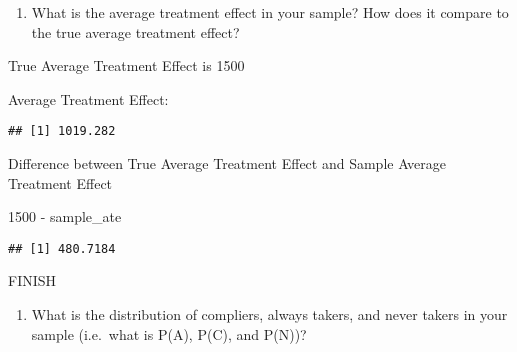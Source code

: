 \documentclass[
]{article}
\newenvironment{Shaded}{\begin{snugshade}}{\end{snugshade}}
\newcommand{\DecValTok}[1]{\textcolor[rgb]{0.00,0.00,0.81}{#1}}
\newcommand{\FunctionTok}[1]{\textcolor[rgb]{0.00,0.00,0.00}{#1}}
\newcommand{\NormalTok}[1]{#1}
\newcommand{\OtherTok}[1]{\textcolor[rgb]{0.56,0.35,0.01}{#1}}
\newcommand{\SpecialCharTok}[1]{\textcolor[rgb]{0.00,0.00,0.00}{#1}}
\newcommand{\StringTok}[1]{\textcolor[rgb]{0.31,0.60,0.02}{#1}}
\providecommand{\tightlist}{%
  \setlength{\itemsep}{0pt}\setlength{\parskip}{0pt}}
\begin{document}
\begin{enumerate}
\def\labelenumi{\arabic{enumi}.}
\tightlist
\item
  What is the average treatment effect in your sample? How does it
  compare to the true average treatment effect?
\end{enumerate}

True Average Treatment Effect is 1500

Average Treatment Effect:

\begin{Shaded}
\end{Shaded}

\begin{verbatim}
## [1] 1019.282
\end{verbatim}

Difference between True Average Treatment Effect and Sample Average
Treatment Effect

\begin{Shaded}
\begin{Highlighting}[]
\DecValTok{1500} \SpecialCharTok{{-}}\NormalTok{ sample\_ate}
\end{Highlighting}
\end{Shaded}

\begin{verbatim}
## [1] 480.7184
\end{verbatim}

FINISH

\begin{enumerate}
\def\labelenumi{\arabic{enumi}.}
\setcounter{enumi}{1}
\tightlist
\item
  What is the distribution of compliers, always takers, and never takers
  in your sample (i.e.~what is P(A), P(C), and P(N))?
\end{enumerate}
\end{document}
